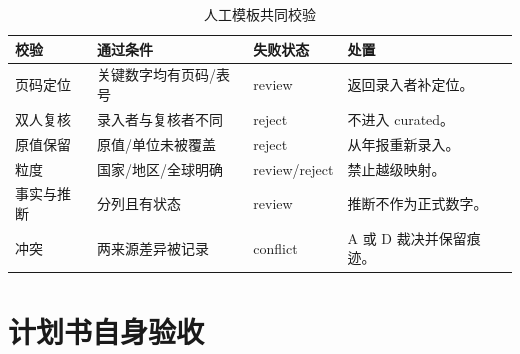 \documentclass[UTF8,fontset=windows,12pt,openany]{ctexbook}
\begin{document}
\begin{longtable}{p{3.3cm}p{3.4cm}p{3.3cm}p{3.4cm}}
\caption{人工模板共同校验}\label{tab:manual-template-qa}\\
\toprule
\textbf{校验} & \textbf{通过条件} & \textbf{失败状态} & \textbf{处置}\\
\midrule
页码定位 & 关键数字均有页码/表号 & review & 返回录入者补定位。\\
双人复核 & 录入者与复核者不同 & reject & 不进入 curated。\\
原值保留 & 原值/单位未被覆盖 & reject & 从年报重新录入。\\
粒度 & 国家/地区/全球明确 & review/reject & 禁止越级映射。\\
事实与推断 & 分列且有状态 & review & 推断不作为正式数字。\\
冲突 & 两来源差异被记录 & conflict & A 或 D 裁决并保留痕迹。\\
\bottomrule
\end{longtable}

\chapter{计划书自身验收}
\end{document}
